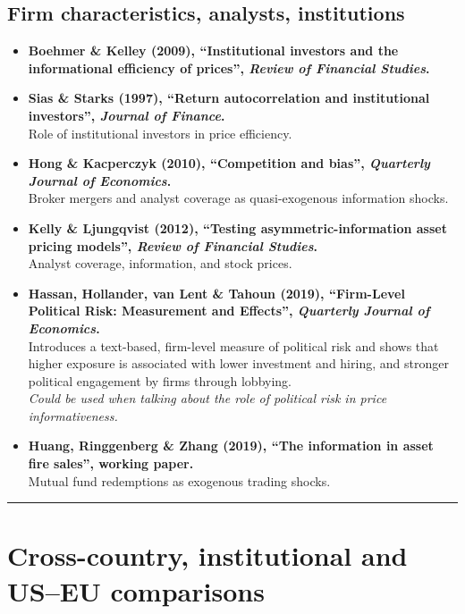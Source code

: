 \documentclass[11pt,a4paper]{article}
\begin{document}
\subsection{Firm characteristics, analysts, institutions}

\begin{itemize}
  \item \textbf{Boehmer \& Kelley (2009), ``Institutional investors and the informational efficiency of prices'', \emph{Review of Financial Studies}.}
  \item \textbf{Sias \& Starks (1997), ``Return autocorrelation and institutional investors'', \emph{Journal of Finance}.}\\
  Role of institutional investors in price efficiency.

  \item \textbf{Hong \& Kacperczyk (2010), ``Competition and bias'', \emph{Quarterly Journal of Economics}.}\\
  Broker mergers and analyst coverage as quasi-exogenous information shocks.

  \item \textbf{Kelly \& Ljungqvist (2012), ``Testing asymmetric-information asset pricing models'', \emph{Review of Financial Studies}.}\\
  Analyst coverage, information, and stock prices.

  \item \textbf{Hassan, Hollander, van Lent \& Tahoun (2019), ``Firm-Level Political Risk: Measurement and Effects'', \emph{Quarterly Journal of Economics}.}\\
  Introduces a text-based, firm-level measure of political risk and shows that higher exposure is associated with lower investment and hiring, and stronger political engagement by firms through lobbying.\\
  \textit{Could be used when talking about the role of political risk in price informativeness.}

  \item \textbf{Huang, Ringgenberg \& Zhang (2019), ``The information in asset fire sales'', working paper.}\\
  Mutual fund redemptions as exogenous trading shocks.
\end{itemize}

\bigskip
\hrule
\bigskip

\section{Cross-country, institutional and US--EU comparisons}
\end{document}
